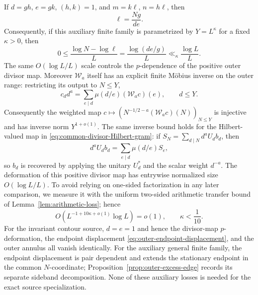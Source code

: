 \begin{proposition}
If $d=gh$, $e=gk$, $(h,k)=1$, and
$m=k\ell$, $n=h\ell$, then
\begin{equation}
\boxed{\ell=\frac{Ng}{de}.}
\label{eq:ell-N-displacement}
\end{equation}
Consequently, if this auxiliary finite family is parametrized by
$Y=L^\kappa$ for a fixed $\kappa>0$, then
\begin{equation}
0\le\frac{\log N-\log\ell}{L}
=\frac{\log(de/g)}{L}
\ll_\kappa\frac{\log L}{L}.
\label{eq:outer-endpoint-displacement}
\end{equation}
The same $O(\log L/L)$ scale controls the $p$-dependence of the positive outer
divisor map. Moreover $\mathcal W_a$ itself has an explicit finite M\"obius
inverse on the outer range: restricting its output to $N\le Y$,
\begin{equation}
\boxed{
 c_dd^a=\sum_{e\mid d}\mu(d/e)(\mathcal W_ac)(e),
 \qquad d\le Y.
}
\label{eq:Wa-mobius}
\end{equation}
Consequently the weighted map
$c\mapsto(N^{-1/2-a}(\mathcal W_ac)(N))_{N\le Y}$ is injective and has inverse
norm $Y^{1+o(1)}$. The same inverse bound holds for the Hilbert-valued map in
\eqref{eq:common-divisor-Hilbert-gram}: if
$S_N=\sum_{d\mid N}d^aU_db_d$, then
\[
d^aU_db_d=\sum_{e\mid d}\mu(d/e)S_e,
\]
so $b_d$ is recovered by applying the unitary $U_d^*$ and the scalar weight
$d^{-a}$. The deformation of this positive divisor map has entrywise
normalized size $O(\log L/L)$. To avoid relying on one-sided factorization in
any later comparison, we measure it with the uniform two-sided arithmetic
transfer bound of Lemma~\ref{lem:arithmetic-loss}; hence
\begin{equation}
\boxed{O\!\left(L^{-1+10\kappa+o(1)}\log L\right)=o(1),
\qquad \kappa<\frac1{10}.}
\label{eq:outer-divisor-deformation}
\end{equation}
For the invariant contour source, $d=e=1$ and hence the divisor-map
$p$-deformation, the endpoint displacement
\eqref{eq:outer-endpoint-displacement}, and the outer annulus all vanish
identically. For the auxiliary general finite family, the endpoint displacement
is pair dependent and extends the stationary endpoint in the common
$N$-coordinate; Proposition~\ref{prop:outer-excess-edge} records its separate
sideband decomposition. None of these auxiliary losses is needed for the exact
source specialization.
\end{proposition}

